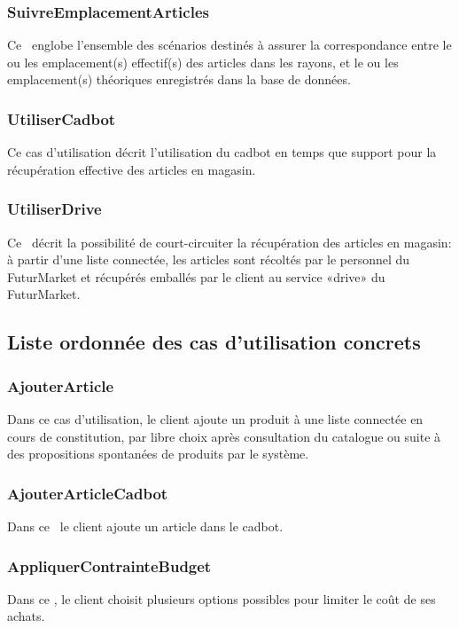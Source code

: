 \subsubsection{SuivreEmplacementArticles}
Ce \cu\ englobe l'ensemble des scénarios destinés à assurer la correspondance entre le ou les emplacement(s) effectif(s) des articles dans les rayons, et le ou les emplacement(s) théoriques enregistrés dans la base de données.

\subsubsection{UtiliserCadbot}
Ce cas d'utilisation décrit l'utilisation du cadbot en temps que support pour la récupération effective des articles en magasin.

\subsubsection{UtiliserDrive}
Ce \cu\ décrit la possibilité de court-circuiter la récupération des articles en magasin: à partir d'une liste connectée, les articles sont récoltés par le personnel du FuturMarket et récupérés emballés par le client au service «drive» du FuturMarket.


\subsection{Liste ordonnée des cas d'utilisation concrets}

\subsubsection{AjouterArticle}
Dans ce cas d'utilisation, le client ajoute un produit à une liste connectée en cours de constitution, par libre choix après consultation du catalogue ou suite à des propositions spontanées de produits par le système.

\subsubsection{AjouterArticleCadbot}
Dans ce \cu\ le client ajoute un article dans le cadbot.

\subsubsection{AppliquerContrainteBudget}
Dans ce \cu, le client choisit plusieurs options possibles pour limiter le coût de ses achats.

